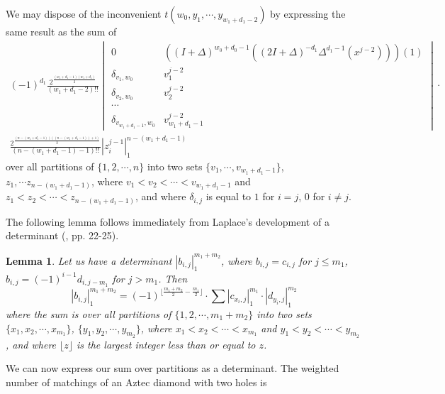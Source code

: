 \documentclass[10pt,reqno]{amsart}
\theoremstyle{plain}
\newtheorem{Lem}[Thm]{Lemma}
\theoremstyle{definition}
\theoremstyle{remark}
\def\determinant#1{\left|#1\right|}
\begin{document}
We may dispose of the inconvenient $t(w_0,y_1,\dotsb,y_{w_1+d_1-2})$
by expressing the same result as the sum of
\begin{equation}
\begin{aligned}
(-1)^{d_1}
\frac{2^{\frac{(w_1+d_1-1)(w_1+d_1)}{2}}}{(w_1+d_1-2)!!}
\begin{vmatrix}
0 & ((I+\Delta)^{w_0+d_0-1}((2I+\Delta)^{-d_1}\Delta^{d_1-1}(x^{j-2})))(1) \\
\delta_{v_1,w_0} & v_1^{j-2} \\
\delta_{v_2,w_0} & v_2^{j-2} \\
\dotsb \\
\delta_{v_{w_1+d_1-1},w_0} & v_{w_1+d_1-1}^{j-2}
\end{vmatrix}
\cdot \\
\frac{2^{\frac{(n-(w_1+d_1-1))((n-(w_1+d_1-1))+1)}{2}}}
	{(n-(w_1+d_1-1)-1)!!} 
\determinant{z_i^{j-1}}_1^{n-(w_1+d_1-1)}
\end{aligned}
\end{equation}
over all partitions of $\{1,2,\dotsb ,n\}$ into two sets
$\{v_1,\dotsb,v_{w_1+d_1-1}\}$, $z_1,\dotsb z_{n-(w_1+d_1-1)}$,
where $v_1<v_2<\dotsb <v_{w_1+d_1-1}$ and $z_1<z_2<\dotsb<z_{n-(w_1+d_1-1)}$,
and where $\delta_{i,j}$ is equal to $1$ for $i=j$, $0$ for $i\ne j$.

The following lemma follows immediately from Laplace's development of
a determinant (\cite{Turnbull}, pp. 22-25).

\begin{Lem} \label{Lemma:C}
Let us have a determinant $\determinant{b_{i,j}}_1^{m_1+m_2}$, where
$b_{i,j} = c_{i,j}$ for $j\leq m_1$, $b_{i,j} = (-1)^{i-1} d_{i,j-m_1}$ for
$j>m_1$. Then 
\begin{equation}
\determinant{b_{i,j}}_1^{m_1+m_2} =
  (-1)^{\lfloor \frac{m_1+m_2}{2} - \frac{m_1}{2} \rfloor } \cdot
\sum \determinant{c_{x_i,j}}_1^{m_1} \cdot 
     \determinant{d_{y_i,j}}_1^{m_2}
\end{equation}
where the sum is over all partitions of $\{1,2,\dotsb , m_1+m_2\}$
into two sets $\{x_1,x_2,\dotsb , x_{m_1}\}$, $\{y_1,y_2,\dotsb , y_{m_2}\}$,
where $x_1<x_2<\dotsb <x_{m_1}$ and $y_1<y_2<\dotsb < y_{m_2}$,
and where $\lfloor z \rfloor$ is the largest integer less than or
equal to $z$.
\end{Lem}

We can now express our sum over partitions as a determinant. The
weighted number of matchings of an Aztec diamond with two holes is
\end{document}
